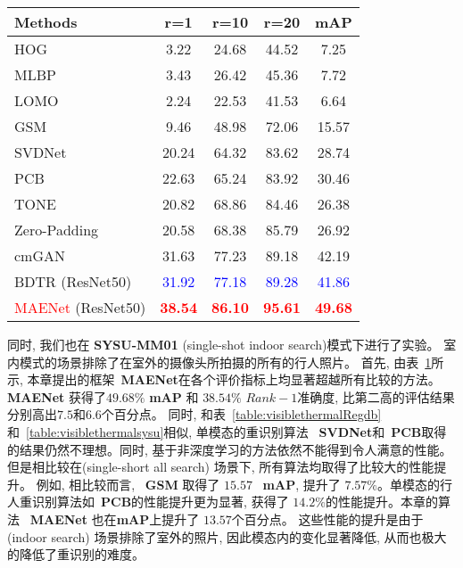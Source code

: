 \begin{table}[!htpb]
  \centering
  \begin{tabular}{cccccc}
     \\ \hline
  \multicolumn{2}{l|}{Methods} & r=1 &r=10 & r=20 & mAP   \\\hline
  
  \multicolumn{2}{l|}{HOG} & 3.22 & 24.68 & 44.52 & 7.25  \\
  \multicolumn{2}{l|}{MLBP} & 3.43 & 26.42 & 45.36 & 7.72  \\
  \multicolumn{2}{l|}{LOMO\cite{liao2015person}} &  2.24 & 22.53 & 41.53 & 6.64 \\
  \multicolumn{2}{l|}{GSM\cite{lin2016cross}} &  9.46 & 48.98 & 72.06 & 15.57  \\

  \hline
  \hline
  \multicolumn{2}{l|}{SVDNet\cite{sun2017svdnet}} & 20.24 & 64.32 & 83.62 & 28.74  \\
  \multicolumn{2}{l|}{PCB\cite{sun2018beyond}} & 22.63 & 65.24 & 83.92 & 30.46  \\ 
  \hline
  \hline
  \multicolumn{2}{l|}{TONE\cite{ye2018hierarchical}} &  20.82 & 68.86 & 84.46 & 26.38  \\
  \multicolumn{2}{l|}{Zero-Padding\cite{wu2017rgb} }& 20.58 & 68.38 & 85.79 & 26.92  \\
  \multicolumn{2}{l|}{cmGAN\cite{dai2018cross} }& 31.63 & 77.23 & 89.18 & 42.19  \\
  \multicolumn{2}{l|}{BDTR (ResNet50)\cite{ye2018visible} }& \textcolor{blue}{31.92} & \textcolor{blue}{77.18} & \textcolor{blue}{89.28} & \textcolor{blue}{41.86}  \\
  \hline
  \hline
   \multicolumn{2}{l|}{\textcolor{red}{MAENet} (ResNet50) }&\textcolor{red}{\textbf{38.54}} & \textcolor{red}{\textbf{86.10}} & \textcolor{red}{\textbf{95.61}} & \textcolor{red}{\textbf{49.68}} \\
   \hline
   \hline
  \end{tabular}
  \label{table:sysuindoor}
\end{table}
同时, 我们也在 \textbf{SYSU-MM01} (single-shot indoor search)模式下进行了实验。 室内模式的场景排除了在室外的摄像头所拍摄的所有的行人照片。 首先, 由表~\ref{table:sysuindoor}所示, 本章提出的框架~\textbf{MAENet}在各个评价指标上均显著超越所有比较的方法。 \textbf{MAENet} 获得了$49.68 \%$ \textbf{mAP} 和 $38.54 \%$ $Rank-1$准确度, 比第二高的评估结果分别高出$7.5$和$6.6$个百分点。 同时, 和表~\ref{table:visiblethermalRegdb}和~\ref{table:visiblethermalsysu}相似, 单模态的重识别算法 ~\textbf{SVDNet}和~\textbf{PCB}取得的结果仍然不理想。同时, 基于非深度学习的方法依然不能得到令人满意的性能。但是相比较在(single-short all search) 场景下, 所有算法均取得了比较大的性能提升。 例如, 相比较而言, ~\textbf{GSM} 取得了 $15.57$ ~\textbf{mAP}, 提升了 $7.57 \%$。单模态的行人重识别算法如~\textbf{PCB}的性能提升更为显著, 获得了 $14.2 \%$的性能提升。本章的算法 ~\textbf{MAENet} 也在\textbf{mAP}上提升了 $13.57$个百分点。 这些性能的提升是由于 (indoor search) 场景排除了室外的照片, 因此模态内的变化显著降低, 从而也极大的降低了重识别的难度。
